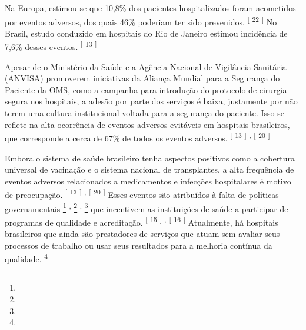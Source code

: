 \documentclass{article}
\begin{document}
Na Europa, estimou-se que 10,8\% dos pacientes hospitalizados foram acometidos por eventos
        adversos, dos quais 46\% poderiam ter sido prevenidos. %
\textsuperscript{[}%
\textsuperscript{22}
\textsuperscript{]}  
 No Brasil, estudo conduzido em hospitais do Rio de Janeiro estimou incidência de
        7,6\% desses eventos. %
\textsuperscript{[}%
\textsuperscript{13}
\textsuperscript{]}  


Apesar de o Ministério da Saúde e a Agência Nacional de Vigilância Sanitária (ANVISA)
        promoverem iniciativas da Aliança Mundial para a Segurança do Paciente da OMS, como a
        campanha para introdução do protocolo de cirurgia segura nos hospitais, a adesão por parte
        dos serviços é baixa, justamente por não terem uma cultura institucional voltada para a
        segurança do paciente. Isso se reflete na alta ocorrência de eventos adversos evitáveis em
        hospitais brasileiros, que corresponde a cerca de 67\% de todos os eventos adversos. %
\textsuperscript{[}%
\textsuperscript{13}
\textsuperscript{]}  
\textsuperscript{,}
\textsuperscript{[}%
\textsuperscript{20}
\textsuperscript{]}  


Embora o sistema de saúde brasileiro tenha aspectos positivos como a cobertura universal de
        vacinação e o sistema nacional de transplantes, a alta frequência de eventos adversos
        relacionados a medicamentos e infecções hospitalares é motivo de preocupação. %
\textsuperscript{[}%
\textsuperscript{13}
\textsuperscript{]}  
\textsuperscript{,}
\textsuperscript{[}%
\textsuperscript{20}
\textsuperscript{]}  
 Esses eventos são atribuídos à falta de políticas governamentais %
\footnote{}  
\textsuperscript{,}
\footnote{}  
\textsuperscript{,}
\footnote{}  
 que incentivem as instituições de saúde a participar de programas de qualidade e
        acreditação. %
\textsuperscript{[}%
\textsuperscript{15}
\textsuperscript{]}  
\textsuperscript{,}
\textsuperscript{[}%
\textsuperscript{16}
\textsuperscript{]}  
 Atualmente, há hospitais brasileiros que ainda são prestadores de serviços que atuam
        sem avaliar seus processos de trabalho ou usar seus resultados para a melhoria contínua da
        qualidade. %
\footnote{}  
\end{document}
